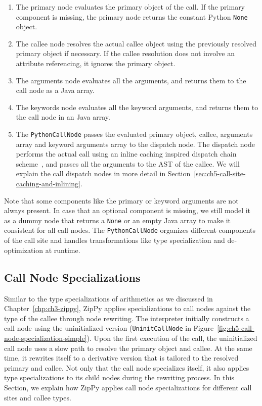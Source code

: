 \begin{enumerate}

\item The primary node evaluates the primary object of the call.
If the primary component is missing, the primary node returns the constant Python \texttt{None} object.

\item The callee node resolves the actual callee object using the previously resolved primary object if necessary.
If the callee resolution does not involve an attribute referencing, it ignores the primary object.

\item The arguments node evaluates all the arguments, and returns them to the call node as a Java array.

\item The keywords node evaluates all the keyword arguments, and returns them to the call node in an Java array.

\item The \texttt{PythonCallNode} passes the evaluated primary object, callee, arguments array and keyword arguments array to the dispatch node.
The dispatch node performs the actual call using an inline caching inspired dispatch chain scheme~\cite{Deutsch1984, holzle1991}, and passes all the arguments to the AST of the callee.
We will explain the call dispatch nodes in more detail in Section~\ref{sec:ch5-call-site-caching-and-inlining}.

\end{enumerate}

Note that some components like the primary or keyword arguments are not always present.
In case that an optional component is missing, we still model it as a dummy node that returns a \texttt{None} or an empty Java array to make it consistent for all call nodes.
The \texttt{PythonCallNode} organizes different components of the call site and handles transformations like type specialization and de-optimization at runtime.

\subsection{Call Node Specializations}

Similar to the type specializations of arithmetics as we discussed in Chapter~\ref{chp:ch3-zippy}, ZipPy applies specializations to call nodes against the type of the callee through node rewriting.
The interpreter initially constructs a call node using the uninitialized version (\texttt{UninitCallNode} in Figure~\ref{fig:ch5-call-node-specialization-simple}).
Upon the first execution of the call, the uninitialized call node uses a slow path to resolve the primary object and callee.
At the same time, it rewrites itself to a derivative version that is tailored to the resolved primary and callee.
Not only that the call node specializes itself, it also applies type specializations to its child nodes during the rewriting process.
In this Section, we explain how ZipPy applies call node specializations for different call sites and callee types.

